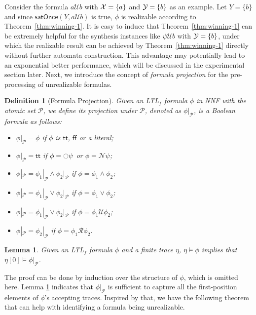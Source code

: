 \documentclass[letterpaper]{article} %
\newcommand{\N}{\mathcal{N}} \newcommand{\R}{\mathcal{R}} \newcommand{\A}{\mathcal{A}}
\newcommand{\U}{\mathcal{U}} \newcommand{\V}{\mathcal{V}} %
\newcommand{\ltlf}{\textsf{LTL}$_f$\xspace}
\newcommand{\ff}{\textsf{ff}\xspace}
\newcommand{\true}{\textsf{tt}\xspace}
\newtheorem{lemma}{Lemma}
\newtheorem{definition}{Definition}
\def\satOnce{\mathsf{satOnce}\xspace}
\newcommand{\NNF}{{\sf NNF}\xspace}
\begin{document}
Consider the formula $a\U b$ with $\mathcal{X}=\{a\}$ and $\mathcal{Y}=\{b\}$ as an example. Let $Y= \{b\}$ and since $\satOnce (Y, a\U b)$ is true, $\phi$ is realizable according to Theorem~\ref{thm:winning-1}. It is easy to induce that Theorem~\ref{thm:winning-1} can be extremely helpful for the synthesis instances like $\psi\U b$ with $\mathcal{Y}=\{b\}$, under which the realizable result can be achieved by Theorem~\ref{thm:winning-1} directly without further automata construction. This advantage may potentially lead to an exponential better performance, which will be discussed in the experimental section later. Next, we introduce the concept of \emph{formula projection} for the pre-processing of unrealizable formulas. 

\begin{definition}[Formula Projection]\label{def:fp}
Given an \ltlf formula $\phi$ in \NNF with the atomic set $\mathcal{P}$, we define its projection under $\mathcal{P}$, denoted as $\phi |_\mathcal{P}$, is a Boolean formula as follows:
\begin{itemize}
	\item $\phi|_\mathcal{P} = \phi$ if $\phi$ is $\true$, $\ff$ or a literal;
	\item $\phi|_\mathcal{P} = \true$ if $\phi = \ocircle\psi$ or $\phi = \N\psi$;
	\item $\phi|_\mathcal{P} = \phi_1|_\mathcal{P} \wedge \phi_2|_\mathcal{P}$ if $\phi = \phi_1\wedge\phi_2$;
	\item $\phi|_\mathcal{P} = \phi_1|_\mathcal{P} \vee \phi_2|_\mathcal{P}$ if $\phi = \phi_1\vee\phi_2$;
	\item $\phi|_\mathcal{P} = \phi_1|_\mathcal{P} \vee \phi_2|_\mathcal{P}$ if $\phi = \phi_1\U\phi_2$;
	\item $\phi|_\mathcal{P} = \phi_2|_\mathcal{P}$ if $\phi = \phi_1\R\phi_2$.
\end{itemize}
\end{definition}

\begin{lemma}\label{lem:fp}
Given an \ltlf formula $\phi$ and a finite trace $\eta$, $\eta\models\phi$ implies that $\eta[0]\models\phi|_\mathcal{P}$.
\end{lemma}
The proof can be done by induction over the structure of $\phi$, which is omitted here. Lemma \ref{lem:fp} indicates that $\phi|_\mathcal{P}$ is sufficient to capture all the first-position elements of $\phi$'s accepting traces. Inspired by that, we have the following theorem that can help with identifying a formula being unrealizable. 
\end{document}
